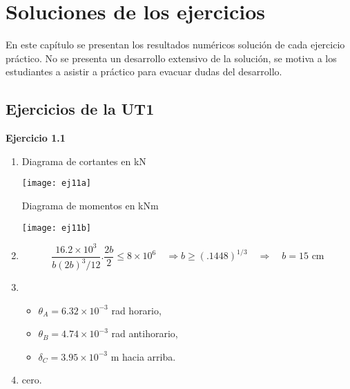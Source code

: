 %
%
%

\chapter{Soluciones de los ejercicios}

En este capítulo se presentan los resultados numéricos solución de cada ejercicio práctico. No se presenta un desarrollo extensivo de la solución, se motiva a los estudiantes a asistir a práctico para evacuar dudas del desarrollo.

\section{Ejercicios de la UT1}

\textbf{Ejercicio 1.1}\\
\begin{enumerate}[label=\alph*)]
\item Diagrama de cortantes en kN

\begin{center}
	\texttt{[image: ej11a]}
\end{center}

Diagrama de momentos en kNm

\begin{center}
	\texttt{[image: ej11b]}
\end{center}

\item 
$$
\frac{16.2 \times 10^3}{b (2b)^3/12} . \frac{2b}{2} \leq 8\times 10^6 \quad \Rightarrow
b \geq (.1448)^{1/3} \quad \Rightarrow \quad 
b = 15 \text{ cm}
$$
\item
\begin{itemize}
	\item $\theta_A = 6.32 \times 10^{-3}$ rad  horario,
	\item $\theta_B = 4.74 \times 10^{-3}$ rad antihorario,
	\item $\delta_C = 3.95 \times 10^{-3}$ m hacia arriba.
\end{itemize}
\item cero.

\end{enumerate}


